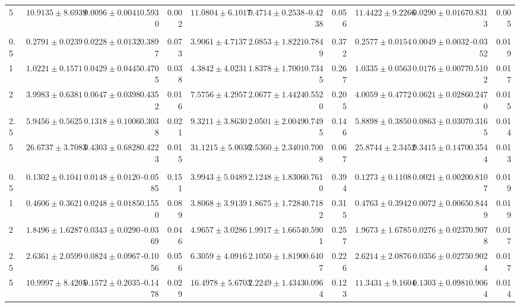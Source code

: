 \begin{tabular}{lrrrrrrrrrrrr}
5 & $10.9135 \pm 8.6939$ & $0.0096 \pm 0.0041$ & 0.5930 & 0.002 & $11.0804 \pm 6.1017$ & $0.4714 \pm 0.2538$ & -0.4238 & 0.056 & $11.4422 \pm 9.2266$ & $0.0290 \pm 0.0167$ & 0.8313 & 0.005 \\
\addlinespace
\multicolumn{13}{l}{\textit{Sin-Hom}} \\
0.5 & $0.2791 \pm 0.0239$ & $0.0228 \pm 0.0132$ & 0.3897 & 0.073 & $3.9061 \pm 4.7137$ & $2.0853 \pm 1.8221$ & 0.7849 & 0.372 & $0.2577 \pm 0.0154$ & $0.0049 \pm 0.0032$ & -0.0352 & 0.019 \\
1 & $1.0221 \pm 0.1571$ & $0.0429 \pm 0.0445$ & 0.4705 & 0.038 & $4.3842 \pm 4.0231$ & $1.8378 \pm 1.7001$ & 0.7345 & 0.267 & $1.0335 \pm 0.0563$ & $0.0176 \pm 0.0077$ & 0.5102 & 0.017 \\
2 & $3.9983 \pm 0.6381$ & $0.0647 \pm 0.0398$ & 0.4352 & 0.016 & $7.5756 \pm 4.2957$ & $2.0677 \pm 1.4424$ & 0.5520 & 0.205 & $4.0059 \pm 0.4772$ & $0.0621 \pm 0.0286$ & 0.2470 & 0.015 \\
2.5 & $5.9456 \pm 0.5625$ & $0.1318 \pm 0.1006$ & 0.3038 & 0.021 & $9.3211 \pm 3.8630$ & $2.0501 \pm 2.0049$ & 0.7495 & 0.146 & $5.8898 \pm 0.3850$ & $0.0863 \pm 0.0307$ & 0.3165 & 0.014 \\
5 & $26.6737 \pm 3.7083$ & $0.4303 \pm 0.6828$ & 0.4223 & 0.015 & $31.1215 \pm 5.0036$ & $2.5360 \pm 2.3401$ & 0.7008 & 0.067 & $25.8744 \pm 2.3452$ & $0.3415 \pm 0.1470$ & 0.3544 & 0.013 \\
\addlinespace
\multicolumn{13}{l}{\textit{Sin-Het}} \\
0.5 & $0.1302 \pm 0.1041$ & $0.0148 \pm 0.0120$ & -0.0585 & 0.151 & $3.9943 \pm 5.0489$ & $2.1248 \pm 1.8306$ & 0.7610 & 0.394 & $0.1273 \pm 0.1108$ & $0.0021 \pm 0.0020$ & 0.8107 & 0.019 \\
1 & $0.4606 \pm 0.3621$ & $0.0248 \pm 0.0185$ & 0.1550 & 0.089 & $3.8068 \pm 3.9139$ & $1.8675 \pm 1.7284$ & 0.7182 & 0.315 & $0.4763 \pm 0.3942$ & $0.0072 \pm 0.0065$ & 0.8449 & 0.019 \\
2 & $1.8496 \pm 1.6287$ & $0.0343 \pm 0.0290$ & -0.0369 & 0.046 & $4.9657 \pm 3.0286$ & $1.9917 \pm 1.6654$ & 0.5901 & 0.257 & $1.9673 \pm 1.6785$ & $0.0276 \pm 0.0237$ & 0.9078 & 0.017 \\
2.5 & $2.6361 \pm 2.0599$ & $0.0824 \pm 0.0967$ & -0.1056 & 0.056 & $6.3059 \pm 4.0916$ & $2.1050 \pm 1.8190$ & 0.6407 & 0.226 & $2.6214 \pm 2.0876$ & $0.0356 \pm 0.0275$ & 0.9024 & 0.017 \\
5 & $10.9997 \pm 8.4205$ & $0.1572 \pm 0.2035$ & -0.1478 & 0.029 & $16.4978 \pm 5.6703$ & $2.2249 \pm 1.4343$ & 0.0964 & 0.123 & $11.3431 \pm 9.1604$ & $0.1303 \pm 0.0981$ & 0.9064 & 0.014 \\
\bottomrule
\end{tabular}
